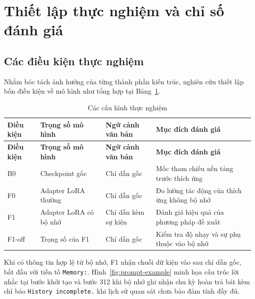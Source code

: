 \section{Thiết lập thực nghiệm và chỉ số đánh giá}

\subsection{Các điều kiện thực nghiệm}
\label{sec:conditions}

Nhằm bóc tách ảnh hưởng của từng thành phần kiến trúc, nghiên cứu thiết lập bốn điều kiện về mô hình như tổng hợp tại Bảng~\ref{tab:experimental-conditions}.

\begingroup\small\setlength{\tabcolsep}{4pt}\renewcommand{\arraystretch}{1.15}
\begin{longtable}{>{\raggedright\arraybackslash}p{}|>{\raggedright\arraybackslash}p{}|>{\raggedright\arraybackslash}p{}|>{\raggedright\arraybackslash}p{}}
\caption{Các cấu hình thực nghiệm}\label{tab:experimental-conditions}\\
\toprule
\textbf{Điều kiện} & \textbf{Trọng số mô hình} & \textbf{Ngữ cảnh văn bản} & \textbf{Mục đích đánh giá} \\
\midrule\endfirsthead
\toprule
\textbf{Điều kiện} & \textbf{Trọng số mô hình} & \textbf{Ngữ cảnh văn bản} & \textbf{Mục đích đánh giá} \\
\midrule\endhead
\bottomrule\endfoot
B0 & Checkpoint gốc & Chỉ dẫn gốc & Mốc tham chiếu nền tảng trước thích ứng \\
F0 & Adapter LoRA thường & Chỉ dẫn gốc & Đo lường tác động của thích ứng không bộ nhớ \\
F1 & Adapter LoRA có bộ nhớ & Chỉ dẫn kèm sự kiện & Đánh giá hiệu quả của phương pháp đề xuất \\
F1-off & Trọng số của F1 & Chỉ dẫn gốc & Kiểm tra độ nhạy và sự phụ thuộc vào bộ nhớ \\
\end{longtable}
\endgroup

Khi có thông tin hợp lệ từ bộ nhớ, F1 nhận chuỗi dữ kiện vào sau chỉ dẫn gốc, bắt đầu với tiền tố \texttt{Memory:}. Hình~\ref{fig:prompt-example} minh họa cấu trúc lời nhắc tại bước khởi tạo và bước 312 khi bộ nhớ ghi nhận chu kỳ hoàn trả bát kèm chỉ báo \texttt{History incomplete.} khi lịch sử quan sát chưa bảo đảm tính đầy đủ.

